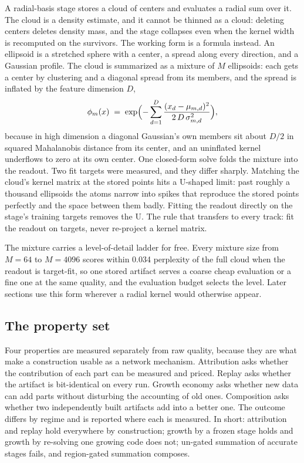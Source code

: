 \documentclass[11pt]{article}
\begin{document}
A radial-basis stage stores a cloud of centers and evaluates a
radial sum over it. The cloud is a density estimate, and it cannot
be thinned as a cloud: deleting centers deletes density mass, and
the stage collapses even when the kernel width is recomputed on the
survivors. The working form is a formula instead. An ellipsoid is a
stretched sphere with a center, a spread along every direction, and
a Gaussian profile. The cloud is summarized as a mixture of $M$
ellipsoids: each gets a center by clustering and a diagonal spread
from its members, and the spread is inflated by the feature
dimension $D$,
\begin{equation}
\phi_m(x) \;=\; \exp\Bigl(-\sum_{d=1}^{D}
  \frac{(x_d - \mu_{m,d})^2}{2\,D\,\sigma_{m,d}^2}\Bigr),
\label{eq:ellipsoid}
\end{equation}
because in high dimension a diagonal Gaussian's own members sit
about $D/2$ in squared Mahalanobis distance from its center, and an
uninflated kernel underflows to zero at its own center. One
closed-form solve folds the mixture into the readout. Two fit
targets were measured, and they differ sharply. Matching the
cloud's kernel matrix at the stored points hits a U-shaped limit:
past roughly a thousand ellipsoids the atoms narrow into spikes
that reproduce the stored points perfectly and the space between
them badly. Fitting the readout directly on the stage's training
targets removes the U. The rule that transfers to every track:
fit the readout on targets, never re-project a kernel matrix.

The mixture carries a level-of-detail ladder for free. Every
mixture size from $M=64$ to $M=4096$ scores within 0.034 perplexity
of the full cloud when the readout is target-fit, so one stored
artifact serves a coarse cheap evaluation or a fine one at the same
quality, and the evaluation budget selects the level. Later
sections use this form wherever a radial kernel would otherwise
appear.

\subsection{The property set}

Four properties are measured separately from raw quality, because
they are what make a construction usable as a network mechanism.
Attribution asks whether the contribution of each part can be
measured and priced. Replay asks whether the artifact is
bit-identical on every run. Growth economy asks whether new data
can add parts without disturbing the accounting of old ones.
Composition asks whether two independently built artifacts add into
a better one. The outcome differs by regime and is reported where
each is measured. In short: attribution and replay hold everywhere
by construction; growth by a frozen stage holds and growth by
re-solving one growing code does not; un-gated summation of
accurate stages fails, and region-gated summation composes.
\end{document}
